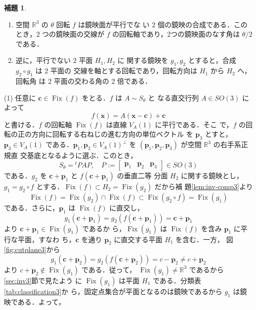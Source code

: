 \documentclass[11pt, uplatex, dvipdfmx, titlepage]{jsarticle}
\makeatletter
\DeclareMathOperator{\Fix}{Fix}
\renewenvironment{proof}[1][\proofname]{\par
  \pushQED{\qed}%
  \normalfont \topsep6\p@\@plus6\p@\relax
  \trivlist
  \item[\hskip\labelsep
         \bfseries
    {#1}]\ignorespaces
}{%
  \popQED\endtrivlist\@endpefalse
}
\theoremstyle{definition}
\newtheorem{lemma}{補題}[section]
\renewcommand{\proofname}{\textbf{証明}}
\makeatother
\begin{document}
\begin{lemma}\label{lem:rotation3}
  \begin{enumerate}[(1)]
  \item 空間 $\mathbb{R}^3$ の $\theta$ 回転 $f$ は鏡映面が平行でな
    い $2$ 個の鏡映の合成である．このとき，$2$ つの鏡映面の交線が $f$
    の回転軸であり，2つの鏡映面のなす角は $\theta/2$ である．
    
  \item 逆に，平行でない $2$ 平面 $H_1, H_2$ に
  関する鏡映を $g_1, g_2$ とすると，合成 $g_2 \circ g_1$ は $2$ 平面の
  交線を軸とする回転であり，回転方向は $H_1$ から $H_2$ へ，回転角
  は $2$ 平面の交わる角の $2$ 倍である．
  \end{enumerate}
\end{lemma}

\begin{proof}
  (1) 任意に $\bm{c} \in \Fix(f)$ をとる．$f$ は $A \sim S_{\theta}$ と
  なる直交行列 $A \in SO(3)$ によって
  \[
    f(\bm{x}) = A(\bm{x} - \bm{c}) + \bm{c}
  \]
  と書ける．$f$ の回転軸 $\Fix(f)$ は直線 $V_A(1)$ に平行である．そこ
  で，$f$ の回転の正の方向に回転する右ねじの進む方向の単位ベクトル
  を $\bm{p}_3$ とすと，$\bm{p}_3 \in V_A(1)$
  である．$\bm{p}_1, \bm{p}_2 \in V_A(1)^{\perp}$ を
  $(\bm{p}_1, \bm{p}_2, \bm{p}_3)$ が空間 $\mathbb{R}^3$ の右手系正規直
  交基底となるように選ぶ．このとき，
  \[
     S_{\theta} = {}^{t}PAP, \quad P := \left[
      \begin{array}{ccc}
        \bm{p}_1 & \bm{p}_2 & \bm{p}_3
      \end{array}
    \right]\in SO(3)
  \]
  である．$g_2$ を $\bm{c}+\bm{p}_1$ と $f(\bm{c}+\bm{p}_1)$ の垂直二等
  分面 $H_2$ に関する鏡映とし，$g_1 = g_2 \circ f$
  とする．$\Fix(f) \subset H_2 = \Fix(g_2)$ だから補
  題\ref{lem:inv-comp3}より
  \[
    \Fix(f) = \Fix(g_2) \cap \Fix(f) \subset \Fix(g_2 \circ f) = \Fix(g_1)
  \]
  である．さらに，$\bm{p}_1$ は $\Fix(f)$ に直交し，
  \[
    g_1 (\bm{c}+\bm{p}_1) = g_2 \left( f(\bm{c}+\bm{p}_1)\right) = \bm{c}+\bm{p}_1
  \]
  より $\bm{c}+\bm{p}_1 \in \Fix(g_1)$ であるか
  ら，$\Fix(g_1)$ は $\Fix(f)$ を含み $\bm{p}_1$ に平行な平面，すなわ
  ち，$\bm{c}$ を通り $\bm{p}_2$ に直交する平面 $H_1$ を含む．一方，
  図\ref{fig:cutplane3}から
  \[
    g_1(\bm{c} + \bm{p}_2) = g_2 \left( f(\bm{c}+\bm{p}_2) \right) = c-\bm{p}_2 \neq c+\bm{p}_2
  \]より $c+\bm{p}_2 \notin \Fix(g_1)$ である．従って，
  $\Fix(g_1) \neq \mathbb{R}^3$ であるから \ref{sec:inv3}節で見たよう
  に $\Fix(g_1)$ は平面 $H_1$ である．分類表\ref{tab:classification3}か
  ら，固定点集合が平面となるのは鏡映であるから $g_1$ は鏡映である．よって，

\end{proof}
\end{document}
